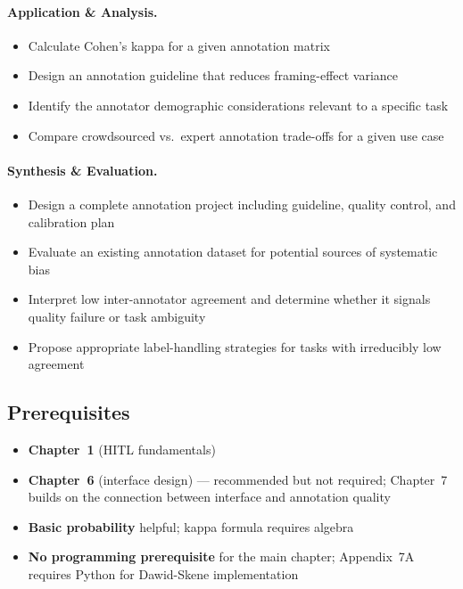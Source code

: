 \paragraph{Application \& Analysis.}
\begin{itemize}
    \item Calculate Cohen's kappa for a given annotation matrix
    \item Design an annotation guideline that reduces framing-effect variance
    \item Identify the annotator demographic considerations relevant to a specific task
    \item Compare crowdsourced vs.\ expert annotation trade-offs for a given use case
\end{itemize}

\paragraph{Synthesis \& Evaluation.}
\begin{itemize}
    \item Design a complete annotation project including guideline, quality control, and calibration plan
    \item Evaluate an existing annotation dataset for potential sources of systematic bias
    \item Interpret low inter-annotator agreement and determine whether it signals quality failure or task ambiguity
    \item Propose appropriate label-handling strategies for tasks with irreducibly low agreement
\end{itemize}

\subsection{Prerequisites}
\begin{itemize}
    \item \textbf{Chapter~1} (HITL fundamentals)
    \item \textbf{Chapter~6} (interface design) --- recommended but not required; Chapter~7 builds on the connection between interface and annotation quality
    \item \textbf{Basic probability} helpful; kappa formula requires algebra
    \item \textbf{No programming prerequisite} for the main chapter; Appendix~7A requires Python for Dawid-Skene implementation
\end{itemize}

